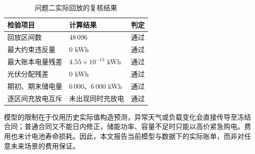 \begin{table}[H]
\centering
\small
\caption{问题二实际回放的复核结果}\label{tab:q2-check}
\begin{tabular}{lll}
\toprule
检验项目 & 计算结果 & 判定\\
\midrule
回放区间数 & 48\,096 & 通过\\
最大约束违反量 & 0 kWh & 通过\\
最大账本电量残差 & $4.55\times10^{-13}$ kWh & 通过\\
光伏分配残差 & 0 kWh & 通过\\
期初、期末储电量 & 6\,000、6\,000 kWh & 通过\\
逐区间充放电互斥 & 未出现同时充放电 & 通过\\
\bottomrule
\end{tabular}
\end{table}

模型的限制在于仅用历史实际值构造预测，异常天气或负载变化会直接传导至冻结合同；普通合同又不能日内修正，储能功率、容量不足时只能以高价紧急购电。费用也未计电池寿命损耗。因此，本文报告当前模型与数据下的实际账单，而非对任意未来场景的费用保证。
\FloatBarrier

